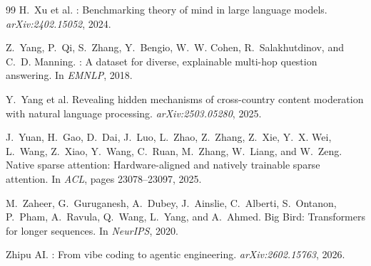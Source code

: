 \documentclass[11pt]{article}
\begin{document}
\begin{thebibliography}{99}
H.~Xu et al.
: Benchmarking theory of mind in large language models.
\newblock \emph{arXiv:2402.15052}, 2024.

Z.~Yang, P.~Qi, S.~Zhang, Y.~Bengio, W.~W. Cohen, R.~Salakhutdinov, and C.~D.
Manning.
: A dataset for diverse, explainable multi-hop question
answering.
\newblock In \emph{EMNLP}, 2018.

Y.~Yang et al.
\newblock Revealing hidden mechanisms of cross-country content moderation with
natural language processing.
\newblock \emph{arXiv:2503.05280}, 2025.

J.~Yuan, H.~Gao, D.~Dai, J.~Luo, L.~Zhao, Z.~Zhang, Z.~Xie, Y.~X. Wei, L.~Wang,
Z.~Xiao, Y.~Wang, C.~Ruan, M.~Zhang, W.~Liang, and W.~Zeng.
\newblock Native sparse attention: Hardware-aligned and natively trainable
sparse attention.
\newblock In \emph{ACL}, pages 23078--23097, 2025.

M.~Zaheer, G.~Guruganesh, A.~Dubey, J.~Ainslie, C.~Alberti, S.~Ontanon,
P.~Pham, A.~Ravula, Q.~Wang, L.~Yang, and A.~Ahmed.
\newblock Big Bird: Transformers for longer sequences.
\newblock In \emph{NeurIPS}, 2020.

Zhipu AI.
: From vibe coding to agentic engineering.
\newblock \emph{arXiv:2602.15763}, 2026.

\end{thebibliography}
\end{document}
